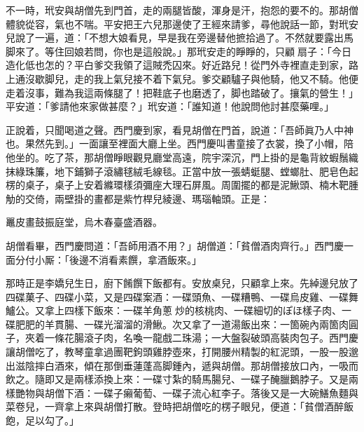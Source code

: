 不一時，玳安與胡僧先到門首，走的兩腿皆酸，渾身是汗，抱怨的要不的。那胡僧體貌從容，氣也不喘。平安把王六兒那邊使了王經來請爹，尋他說話一節，對玳安兒說了一遍，道：「不想大娘看見，早是我在旁邊替他摭拾過了。不然就要露出馬脚來了。等住回娘若問，你也是這般說。」那玳安走的睜睜的，只顧𢵞扇子：「今日造化低也怎的？平白爹交我領了這賊禿囚來。好近路兒！從門外寺裡直走到家，路上通沒歇脚兒，走的我上氣兒接不着下氣兒。爹交顧驢子與他騎，他又不騎。他便走着沒事，難為我這兩條腿了！把鞋底子也磨透了，脚也踏破了。攘氣的營生！」平安道：「爹請他來家做甚麼？」玳安道：「誰知道！他說問他討甚麼藥哩。」

正說着，只聞喝道之聲。西門慶到家，看見胡僧在門首，說道：「吾師眞乃人中神也。果然先到。」一面讓至裡面大廳上坐。西門慶叫書童接了衣裳，換了小帽，陪他坐的。吃了茶，那胡僧睜眼觀見廳堂高遠，院宇深沉，門上掛的是龜背紋蝦鬚織抹綠珠簾，地下鋪獅子滾繡毬絨毛線毯。正當中放一張蜻蜓腿、螳螂肚、肥皂色起楞的桌子，桌子上安着縧環樣須彌座大理石屏風。周圍擺的都是泥鰍頭、楠木靶腫觔的交倚，兩壁掛的畫都是紫竹桿兒綾邊、瑪瑙軸頭。{}正是：

\begin{myquote} 
鼉皮畫鼓振庭堂，烏木春臺盛酒器。
\end{myquote} 

胡僧看畢，西門慶問道：「吾師用酒不用？」胡僧道：「貧僧酒肉齊行。」西門慶一面分付小厮：「後邊不消看素饌，拿酒飯來。」

那時正是李嬌兒生日，廚下餚饌下飯都有。安放桌兒，只顧拿上來。先綽邊兒放了四碟菓子、四碟小菜，又是四碟案酒：一碟頭魚、一碟糟鴨、一碟烏皮雞、一碟舞鱸公。又拿上四樣下飯來：一碟羊角蔥𤆑炒的核桃肉、一碟細切的ぽほ樣子肉、一碟肥肥的羊貫腸、一碟光溜溜的滑鰍。次又拿了一道湯飯出來：一箇碗內兩箇肉圓子，夾着一條花腸滾子肉，名喚一龍戲二珠湯；一大盤裂破頭高裝肉包子。西門慶讓胡僧吃了，教琴童拿過團靶鉤頭雞脖壺來，打開腰州精製的紅泥頭，一股一股邈出滋陰摔白酒來，傾在那倒垂蓮蓬高脚鍾內，遞與胡僧。那胡僧接放口內，一吸而飲之。隨即又是兩樣添換上來：一碟寸紮的騎馬腸兒、一碟子醃臘鵝脖子。又是兩樣艷物與胡僧下酒：一碟子癩葡萄、一碟子流心紅李子。落後又是一大碗鱔魚麵與菜卷兒，一齊拿上來與胡僧打散。登時把胡僧吃的楞子眼兒，便道：「貧僧酒醉飯飽，足以勾了。」

